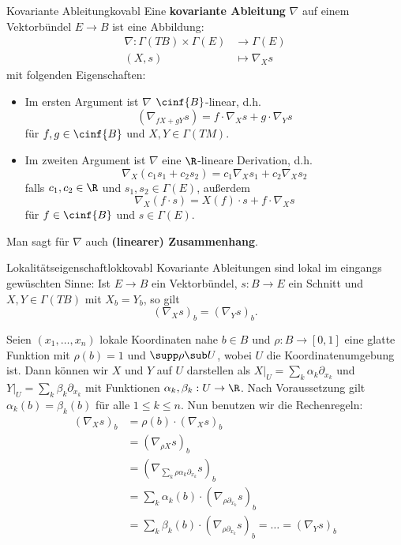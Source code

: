 \begin{definition}{Kovariante Ableitung}{kovabl}
Eine \textbf{kovariante Ableitung} $\nabla$ auf einem Vektorbündel $E \to B$ ist eine Abbildung:
\begin{align}
\nabla: \Gamma (TB) \times \Gamma (E) &\to \Gamma (E)\\
(X, s) &\mapsto \nabla_X s
\end{align}
mit folgenden Eigenschaften:
\begin{itemize}
\item Im ersten Argument ist $\nabla$ $\cinf{B}$-linear, d.h.
\begin{equation}
(\nabla_{fX+gY} s) = f \cdot \nabla_X s + g \cdot \nabla_Y s
\end{equation}
für $f, g \in \cinf{B}$ und $X,Y \in \Gamma (TM)$.
\item Im zweiten Argument ist $\nabla$ eine $\R$-lineare Derivation, d.h.
\begin{equation}
\nabla_X(c_1s_1 + c_2 s_2) = c_1 \nabla_X s_1 + c_2 \nabla_X s_2
\end{equation}
falls $c_1, c_2 \in \R$ und $s_1, s_2 \in \Gamma (E)$, außerdem
\begin{equation}
\nabla_X (f \cdot s) = X(f) \cdot s + f \cdot \nabla_X s
\end{equation}
für $f \in \cinf{B}$ und $s \in \Gamma (E)$.
\end{itemize}
Man sagt für $\nabla$ auch \textbf{(linearer) Zusammenhang}.
\end{definition}
\begin{lemma}{Lokalitätseigenschaft}{lokkovabl}
Kovariante Ableitungen sind lokal im eingangs gewüschten Sinne: Ist $E \to B$ ein Vektorbündel, $s: B \to E$ ein Schnitt und $X, Y \in \Gamma (TB)$ mit $X_b = Y_b$, so gilt
\begin{equation}
(\nabla_X s)_b = (\nabla_Y s)_b.
\end{equation}
\end{lemma}
\begin{beweis}
Seien $(x_1, \dots, x_n)$ lokale Koordinaten nahe $b \in B$ und $\rho: B \to [0,1]$ eine glatte Funktion mit $\rho(b)=1$ und $\supp \rho \sub U$, wobei $U$ die Koordinatenumgebung ist. Dann können wir $X$ und $Y$ auf $U$ darstellen als $X|_U = \sum_k \alpha_k \partial_{x_k}$ und $Y|_U = \sum_k \beta_k \partial_{x_k}$ mit Funktionen $\alpha_k, \beta_k: U \to \R$. Nach Voraussetzung gilt $\alpha_k (b) = \beta_k (b)$ für alle $1 \leq k \leq n$. Nun benutzen wir die Rechenregeln:
\begin{align}
(\nabla_X s)_b &= \rho(b) \cdot (\nabla_X s)_b \\
&= (\nabla_{\rho X} s)_b\\
&= (\nabla_{\sum_k \rho \alpha_k \partial_{x_k}} s)_b \\
&= \sum_k \alpha_k (b) \cdot (\nabla_{\rho \partial_{x_k}} s)_b\\
&= \sum_k \beta_k(b) \cdot (\nabla_{\rho \partial_{x_k}} s)_b = \dots = (\nabla_Y s)_b
\end{align}
\end{beweis}
